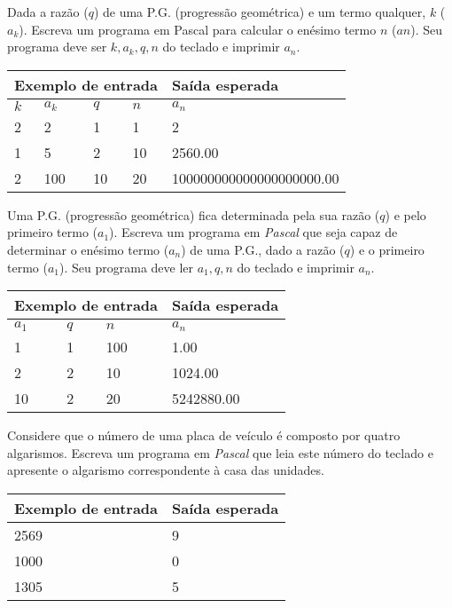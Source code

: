 \item Dada a razão ($q$) de uma P.G. (progressão geométrica) e um termo 
qualquer, $k$ ($a_k$). Escreva um programa em Pascal para calcular o enésimo 
termo $n$ ($an$). Seu programa deve ser $k, a_k, q, n$ do teclado e imprimir
$a_n$.

\begin{center}
\begin{tabular}{|l|l|l|l|l|} \hline
\multicolumn{4}{|c|}{Exemplo de entrada} & Saída esperada \\ \hline
$k$ & $a_k$ & $q$ & $n$  & $a_n$               \\ \hline
2 & 2 & 1 & 1        & 2                \\ \hline
1 & 5 & 2 & 10       & 2560.00             \\ \hline
2 & 100 & 10 & 20    & 100000000000000000000.00               \\ \hline
\end{tabular}
\end{center}

\item Uma P.G. (progressão geométrica) fica determinada pela sua razão ($q$) 
e pelo primeiro termo ($a_1$). Escreva um programa em \emph{Pascal} que 
seja capaz de determinar o enésimo termo ($a_n$) de uma P.G., dado a razão 
($q$) e o primeiro termo ($a_1$). Seu programa deve ler $a_1, q, n$ do 
teclado e imprimir $a_n$.

\begin{center}
\begin{tabular}{|l|l|l|l|} \hline
\multicolumn{3}{|c|}{Exemplo de entrada} & Saída esperada \\ \hline
$a_1$ & $q$ & $n$   & $a_n$               \\ \hline
1 & 1 & 100         & 1.00                \\ \hline
2 & 2 & 10          & 1024.00             \\ \hline
10 & 2 & 20         & 5242880.00          \\ \hline
\end{tabular}
\end{center}

\item Considere que o número de uma placa de veículo é composto por quatro 
algarismos. Escreva um programa em \emph{Pascal} que leia este número  do
teclado e apresente o algarismo correspondente à casa das unidades.

\begin{center}
\begin{tabular}{|l|l|} \hline
Exemplo de entrada & Saída esperada \\ \hline
2569                & 9               \\ \hline
1000                & 0               \\ \hline
1305                & 5               \\ \hline
\end{tabular}
\end{center}

